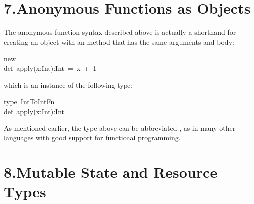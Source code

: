 \documentclass{article}
\begin{document}
\section{7.\hspace*{0.5em}Anonymous Functions as Objects}\label{sec-anonymous-functions-as-objects}%
\begin{mdpre}%
\noindent%
\end{mdpre}\noindent{}The anonymous function syntax described above is actually
a shorthand for creating an object with an  method
that has the same arguments and body:
\begin{mdpre}%
\noindent new\\
def~apply(x:Int):Int~=~x~+~1%
\end{mdpre}\noindent{}which is an instance of the following type:
\begin{mdpre}%
\noindent type~IntToIntFn\\
def~apply(x:Int):Int%
\end{mdpre}\noindent{}As mentioned earlier, the type above can be abbreviated ,
as in many other languages with good support for functional programming.

\section{8.\hspace*{0.5em}Mutable State and Resource Types}\label{sec-mutable-state-and-resource-types}%
\end{document}
